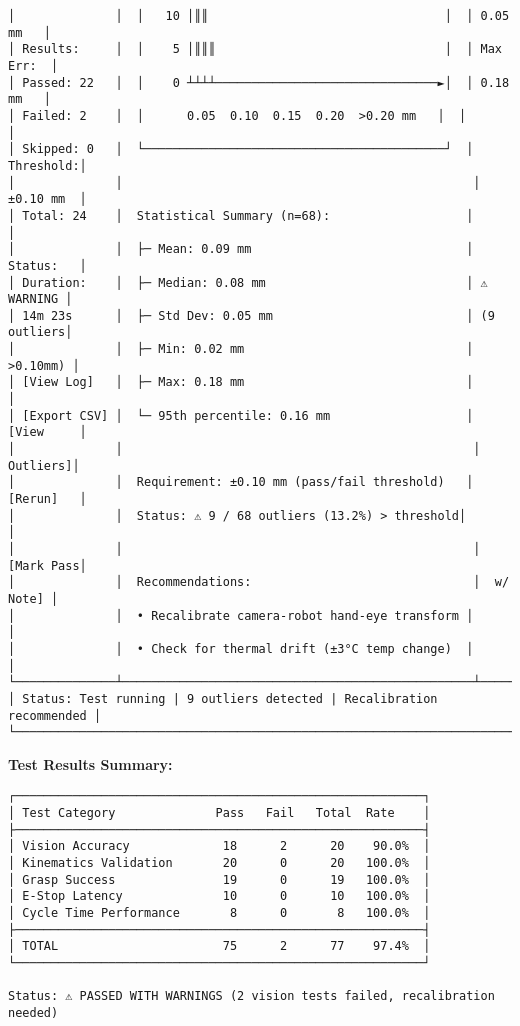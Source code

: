 \documentclass[
]{article}
\begin{document}
\begin{verbatim}
│              │  │   10 │║║                                 │  │ 0.05 mm   │
│ Results:     │  │    5 │║║║                                │  │ Max Err:  │
│ Passed: 22   │  │    0 ┴┴┴┴───────────────────────────────►│  │ 0.18 mm   │
│ Failed: 2    │  │      0.05  0.10  0.15  0.20  >0.20 mm   │  │           │
│ Skipped: 0   │  └──────────────────────────────────────────┘  │ Threshold:│
│              │                                                 │ ±0.10 mm  │
│ Total: 24    │  Statistical Summary (n=68):                   │           │
│              │  ├─ Mean: 0.09 mm                              │ Status:   │
│ Duration:    │  ├─ Median: 0.08 mm                            │ ⚠ WARNING │
│ 14m 23s      │  ├─ Std Dev: 0.05 mm                           │ (9 outliers│
│              │  ├─ Min: 0.02 mm                               │  >0.10mm) │
│ [View Log]   │  ├─ Max: 0.18 mm                               │           │
│ [Export CSV] │  └─ 95th percentile: 0.16 mm                   │ [View     │
│              │                                                 │  Outliers]│
│              │  Requirement: ±0.10 mm (pass/fail threshold)   │ [Rerun]   │
│              │  Status: ⚠ 9 / 68 outliers (13.2%) > threshold│           │
│              │                                                 │ [Mark Pass│
│              │  Recommendations:                               │  w/ Note] │
│              │  • Recalibrate camera-robot hand-eye transform │           │
│              │  • Check for thermal drift (±3°C temp change)  │           │
└──────────────┴─────────────────────────────────────────────────┴───────────┘
│ Status: Test running | 9 outliers detected | Recalibration recommended │
└────────────────────────────────────────────────────────────────────────────┘
\end{verbatim}

\textbf{Test Results Summary:}

\begin{verbatim}
┌─────────────────────────────────────────────────────────┐
│ Test Category              Pass   Fail   Total  Rate    │
├─────────────────────────────────────────────────────────┤
│ Vision Accuracy             18      2      20    90.0%  │
│ Kinematics Validation       20      0      20   100.0%  │
│ Grasp Success               19      0      19   100.0%  │
│ E-Stop Latency              10      0      10   100.0%  │
│ Cycle Time Performance       8      0       8   100.0%  │
├─────────────────────────────────────────────────────────┤
│ TOTAL                       75      2      77    97.4%  │
└─────────────────────────────────────────────────────────┘

Status: ⚠ PASSED WITH WARNINGS (2 vision tests failed, recalibration needed)
\end{verbatim}
\end{document}
